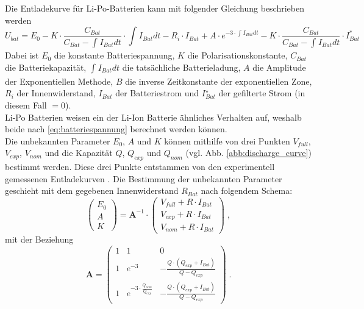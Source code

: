 Die Entladekurve für Li-Po-Batterien kann mit folgender Gleichung beschrieben werden
\begin{equation}
	U_{bat} = E_0-K\cdot\frac{C_{Bat}}{C_{Bat}-\int_{}^{} I_{Bat} dt}\cdot\int_{}^{} I_{Bat} dt - R_{i}\cdot I_{Bat}+A\cdot e^{-3\cdot\int_{}^{} I_{Bat} dt}-K\cdot\frac{C_{Bat}}{C_{Bat}-\int_{}^{} I_{Bat} dt}\cdot I_{Bat}^* \label{eq:batteriespannung}
\end{equation}
Dabei ist \ensuremath{E_0} die konstante Batteriespannung, \ensuremath{K} die Polarisationskonstante, \ensuremath{C_{Bat}} die Batteriekapazität, \ensuremath{\int_{}^{} I_{Bat} dt} die tatsächliche Batterieladung, \ensuremath{A} die Amplitude der Exponentiellen Methode, \ensuremath{B} die inverse Zeitkonstante der exponentiellen Zone, \ensuremath{R_{i}} der Innenwiderstand, \ensuremath{I_{Bat}} der Batteriestrom und \ensuremath{I_{Bat}^\star} der gefilterte Strom (in diesem Fall \(= 0\)). \\
Li-Po Batterien weisen ein der Li-Ion Batterie ähnliches Verhalten auf, weshalb beide nach \ref{eq:batteriespannung} berechnet werden können.\\
Die unbekannten Parameter \ensuremath{E_0}, \ensuremath{A} und \ensuremath{K} können mithilfe von drei Punkten \ensuremath{V_{full}}, \ensuremath{V_{exp}}, \ensuremath{V_{nom}} und die Kapazität \ensuremath{Q}, \ensuremath{Q_{exp}} und \ensuremath{Q_{nom}} (vgl. Abb. \ref{abb:discharge_curve}) bestimmt werden. Diese drei Punkte entstammen von den experimentell gemessenen Entladekurven \cite{elektromodellflug}.
Die Bestimmung der unbekannten Parameter geschieht mit dem gegebenen Innenwiderstand \ensuremath{R_{Bat}} nach folgendem Schema:
\begin{equation}
	\begin{pmatrix} E_0 \\ A \\ K \end{pmatrix} = \textbf{A}^{-1}\cdot \begin{pmatrix}
	V_{full}+R\cdot I_{Bat} \\ V_{exp}+R\cdot I_{Bat} \\ V_{nom}+R\cdot I_{Bat} \end{pmatrix}\; ,
\end{equation}
mit der Beziehung
\begin{equation}
	\textbf{A} = \begin{pmatrix}
	1 & 1 & 0 \\ 1 & e^{-3} & -\frac{Q\cdot (Q_{exp}+I_{Bat})}{Q-Q_{exp}} \\ 1 & e^{-3\cdot\frac{Q_{nom}}{Q_{exp}}} & -\frac{Q\cdot (Q_{exp}+I_{Bat})}{Q-Q_{exp}}
	\end{pmatrix}\; .
\end{equation}
